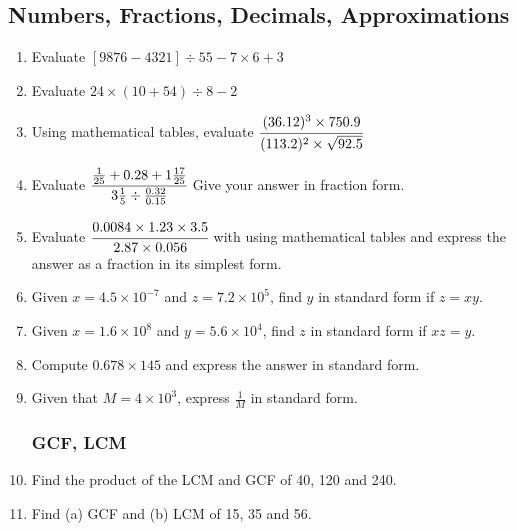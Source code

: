 \subsection{Numbers, Fractions, Decimals, Approximations}
	
\begin{enumerate}


			\subsubsection{Evaluation / BODMAS}
	\item Evaluate $[9876 - 4321] \div 55 - 7 \times 6 + 3$
	
	\item Evaluate $24 \times (10 + 54) \div 8 - 2$
	
	\item Using mathematical tables, evaluate $\cfrac{(36.12)^3 \times 750.9}{(113.2)^2 \times \sqrt{92.5}}$
	
	 \item Evaluate $\cfrac{ \frac{1}{25} + 0.28 + 1\frac{17}{25} }{ 3\frac{1}{5} \div \frac{0.32}{0.15} }$ Give your answer in fraction form.
	 
	 \item Evaluate $\cfrac{0.0084 \times 1.23 \times 3.5}{2.87 \times 0.056}$ with using mathematical tables and express the answer as a fraction in its simplest form.

	\item Given $x = 4.5 \times 10^{-7}$ and $z = 7.2 \times 10^5$, find $y$ in standard form if $z = xy$.
	
	\item Given $x = 1.6 \times 10^8$ and $y = 5.6 \times 10^4$, find $z$ in standard form if $ xz = y$.
	
	\item Compute $0.678 \times 145$ and express the answer in standard form.
	
	\item Given that $M = 4 \times 10^3$, express $\frac{1}{M}$ in standard form.


			\subsubsection{GCF, LCM}
	\item Find the product of the LCM and GCF of 40, 120 and 240.
	
	\item Find (a) GCF and (b) LCM of 15, 35 and 56.
	

\end{enumerate}
